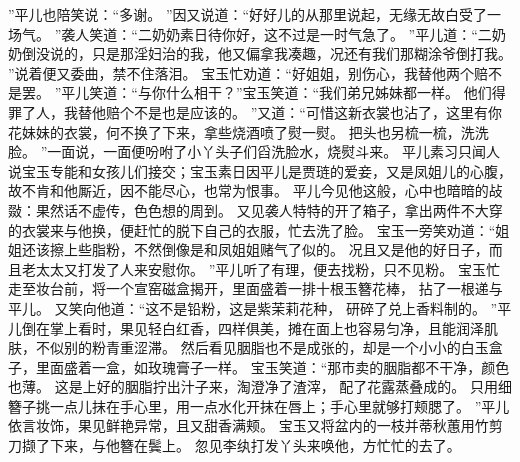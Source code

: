 ”平儿也陪笑说：“多谢。
”因又说道：“好好儿的从那里说起，无缘无故白受了一场气。
”袭人笑道：“二奶奶素日待你好，这不过是一时气急了。
”平儿道：“二奶奶倒没说的，只是那淫妇治的我，他又偏拿我凑趣，况还有我们那糊涂爷倒打我。
”说着便又委曲，禁不住落泪。
宝玉忙劝道：“好姐姐，别伤心，我替他两个赔不是罢。
”平儿笑道：“与你什么相干？”宝玉笑道：“我们弟兄姊妹都一样。
他们得罪了人，我替他赔个不是也是应该的。
”又道：“可惜这新衣裳也沾了，这里有你花妹妹的衣裳，何不换了下来，拿些烧酒喷了熨一熨。
把头也另梳一梳，洗洗脸。
”一面说，一面便吩咐了小丫头子们舀洗脸水，烧熨斗来。
平儿素习只闻人说宝玉专能和女孩儿们接交；宝玉素日因平儿是贾琏的爱妾，又是凤姐儿的心腹，故不肯和他厮近，因不能尽心，也常为恨事。
平儿今见他这般，心中也暗暗的敁敠：果然话不虚传，色色想的周到。
又见袭人特特的开了箱子，拿出两件不大穿的衣裳来与他换，便赶忙的脱下自己的衣服，忙去洗了脸。
宝玉一旁笑劝道：“姐姐还该擦上些脂粉，不然倒像是和凤姐姐赌气了似的。
况且又是他的好日子，而且老太太又打发了人来安慰你。
”平儿听了有理，便去找粉，只不见粉。
宝玉忙走至妆台前，将一个宣窑磁盒揭开，里面盛着一排十根玉簪花棒，
拈了一根递与平儿。
又笑向他道：“这不是铅粉，这是紫茉莉花种，
研碎了兑上香料制的。
”平儿倒在掌上看时，果见轻白红香，四样俱美，摊在面上也容易匀净，且能润泽肌肤，不似别的粉青重涩滞。
然后看见胭脂也不是成张的，却是一个小小的白玉盒子，里面盛着一盒，如玫瑰膏子一样。
宝玉笑道：“那市卖的胭脂都不干净，颜色也薄。
这是上好的胭脂拧出汁子来，淘澄净了渣滓，
配了花露蒸叠成的。
只用细簪子挑一点儿抹在手心里，用一点水化开抹在唇上；手心里就够打颊腮了。
”平儿依言妆饰，果见鲜艳异常，且又甜香满颊。
宝玉又将盆内的一枝并蒂秋蕙用竹剪刀撷了下来，与他簪在鬓上。
忽见李纨打发丫头来唤他，方忙忙的去了。
\par
